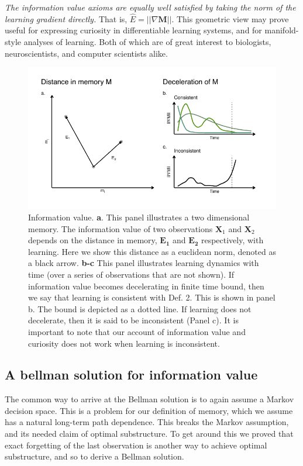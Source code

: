 \emph{The information value axioms are equally well satisfied by taking the norm of the learning gradient directly.} That is, $\hat E = ||\nabla \mathbf{M} ||$. This geometric view may prove useful for expressing curiosity in differentiable learning systems, and for manifold-style analyses of learning. Both of which are of great interest to biologists, neuroscientists, and computer scientists alike. 

\begin{figure}
	\includegraphics[width=1\linewidth]{img/cartoon.pdf} 
	\caption{Information value.
	\textbf{a}. This panel illustrates a two dimensional memory. The information value of two observations $\mathbf{X}_1$ and $\mathbf{X}_2$ depends on the distance in memory, $\mathbf{E_1}$ and $\mathbf{E_2}$ respectively, with learning. Here we show this distance as a euclidean norm, denoted as a black arrow.
	\textbf{b-c} This panel illustrates learning dynamics with time (over a series of observations that are not shown). If information value becomes decelerating in finite time bound, then we say that learning is consistent with Def. 2. This is shown in panel b. The bound is depicted as a dotted line. If learning does not decelerate, then it is said to be inconsistent (Panel c). It is important to note that our account of information value and curiosity does not work when learning is inconsistent.
  	}
	\label{fig:cartoon} 
\end{figure}

\subsection*{A bellman solution for information value}
The common way to arrive at the Bellman solution is to again assume a Markov decision space. This is a problem for our definition of memory, which we assume has a natural long-term path dependence. This breaks the Markov assumption, and its needed claim of optimal substructure. To get around this we proved that exact forgetting of the last observation is another way to achieve optimal substructure, and so to derive a Bellman solution.

